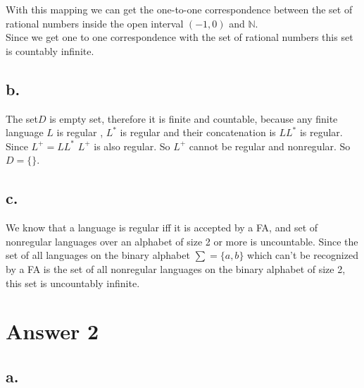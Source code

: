 \documentclass[12pt]{article}
\begin{document}
With this mapping we can get the one-to-one correspondence between the set of rational numbers inside the open interval $(-1,0)$  and  $\mathbb{N}$. 
\\
Since we get one to one correspondence with the set of rational numbers this set is countably infinite.

\subsection*{b.}

The set$D$ is empty set, therefore it is finite and countable, because any finite language $L$ is regular , $L^*$ is regular and their concatenation is $LL^*$ is  regular. Since $L^+ = LL^*$ $L^+$ is also regular. So $L^+$ cannot be regular and nonregular. So $D=\{ \} $.

\subsection*{c.}

We know that a language is regular iff it is accepted by a FA, and set of nonregular languages over an alphabet of size 2 or more is uncountable. Since the set of all languages on the binary alphabet $\sum =\{ a,b \} $ which can't be recognized by a FA is the set of all nonregular languages on the binary alphabet of size 2, this set is uncountably infinite.

\section*{Answer 2}

\subsection*{a.}
\end{document}
